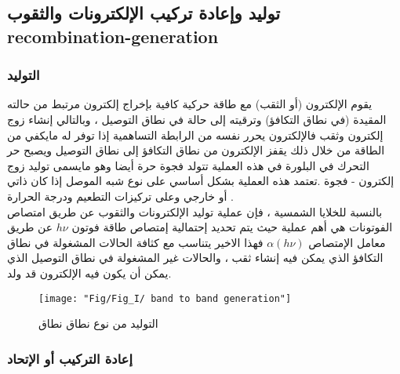 	\subsection{توليد وإعادة تركيب الإلكترونات والثقوب recombination-generation}
	
	
	\subsubsection{ التوليد}
	يقوم الإلكترون (أو الثقب) مع طاقة حركية كافية بإخراج إلكترون مرتبط من حالته المقيدة (في نطاق التكافؤ) وترقيته إلى حالة في نطاق التوصيل ، وبالتالي إنشاء زوج إلكترون وثقب فالإلكترون يحرر نفسه من الرابطة التساهمية إذا توفر له مايكفي من الطاقة من خلال ذلك يقفز الإلكترون من نطاق التكافؤ إلى نطاق التوصيل ويصبح حر التحرك في البلورة في هذه العملية تتولد فجوة حرة أيضا وهو مايسمى توليد زوج إلكترون - فجوة .تعتمد هذه العملية  بشكل أساسي على نوع شبه الموصل إذا كان ذاتي أو خارجي  وعلى تركيزات التطعيم ودرجة الحرارة .
	\\
	بالنسبة للخلايا الشمسية ، فإن عملية توليد الإلكترونات والثقوب عن طريق امتصاص الفوتونات هي أهم عملية حيث يتم تحديد إحتمالية إمتصاص طاقة فوتون $  h\nu $  عن طريق معامل الإمتصاص $  \alpha ( h\nu)$ فهذا الاخير يتناسب مع كثافة الحالات المشغولة في نطاق التكافؤ الذي يمكن فيه إنشاء ثقب ، والحالات غير المشغولة في نطاق التوصيل الذي يمكن أن يكون فيه الإلكترون قد  ولد.
	\begin{figure}[h!]
		\centering
		\texttt{[image: "Fig/Fig\_I/ band to band generation"]}
		\caption{التوليد من نوع نطاق نطاق}
		\label{fig:-band-to-band-generation}
	\end{figure}
	\FloatBarrier
	
	\subsubsection{إعادة التركيب أو الإتحاد}
	
